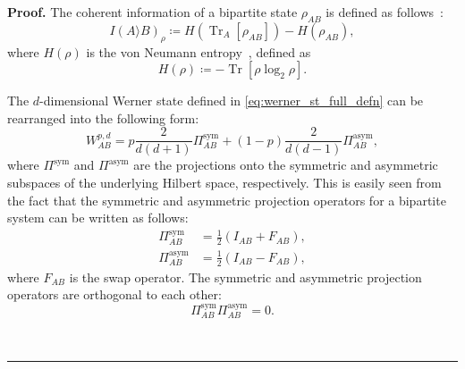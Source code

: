 \documentclass[twocolumn,letterpaper, dvipsnames,allowtoday, accepted = 2025-12-31]{quantumarticle}
\newenvironment{proof}[1][Proof]{\noindent\textbf{#1.} }{\ \rule{0.5em}{0.5em}}
\begin{document}
    \begin{proof}
        The coherent information of a bipartite state $\rho_{AB}$ is defined as follows~\cite{SN96}:
	   \begin{equation}\label{eq:coherent_info_defn}
		  I\!\left(A\rangle B\right)_{\rho} \coloneqq H\!\left(\operatorname{Tr}_A\!\left[\rho_{AB}\right]\right) - H\!\left(\rho_{AB}\right),
	   \end{equation}
	   where $H\!\left(\rho\right)$ is the von Neumann entropy~\cite{Neumann27}, defined as
	   \begin{equation}
		  H\!\left(\rho\right) \coloneqq -\operatorname{Tr}\!\left[\rho\log_2\rho\right].
	   \end{equation} 
        
        The $d$-dimensional Werner state  defined in \eqref{eq:werner_st_full_defn} can be rearranged into the following form:
	\begin{equation}
		W^{p,d}_{AB} = p\frac{2}{d(d+1)}\Pi^{\operatorname{sym}}_{AB} + (1-p)\frac{2}{d(d-1)}\Pi^{\operatorname{asym}}_{AB},
	\end{equation}
	where $\Pi^{\operatorname{sym}}$ and $\Pi^{\operatorname{asym}}$ are the projections onto the symmetric and asymmetric subspaces of the underlying Hilbert space, respectively. This is easily seen from the fact that the symmetric and asymmetric projection operators for a bipartite system can be written as follows:
	\begin{align}
		\Pi^{\operatorname{sym}}_{AB} &= \frac{1}{2}\left(I_{AB} + F_{AB}\right),\label{eq:sym_proj_IF}\\
		\Pi^{\operatorname{asym}}_{AB} &= \frac{1}{2}\left(I_{AB} - F_{AB}\right),\label{eq:asym_proj_IF}
	\end{align}
	where $F_{AB}$ is the swap operator. The symmetric and asymmetric projection operators are orthogonal to each other:
	\begin{equation}
		\Pi^{\operatorname{sym}}_{AB}\Pi^{\operatorname{asym}}_{AB} = 0.
	\end{equation}
	

\end{proof}
\end{document}

